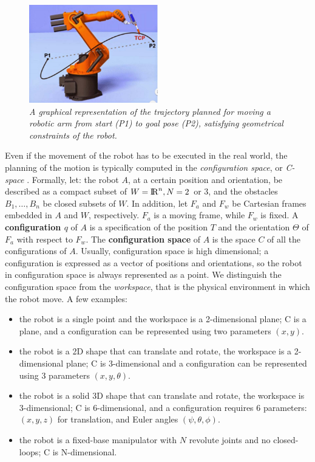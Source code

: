 \begin{figure}
	\centering
	\includegraphics[width=0.5\textwidth]{Images/background_and_tools/motionPlanningArm.png}
	\caption{\textit{A graphical representation of the trajectory planned for moving a robotic arm from start (P1) to goal pose (P2), satisfying geometrical constraints of the robot.}}
	\label{fig:motionPlanningArm}
\end{figure}

Even if the movement of the robot has to be executed in the real world, the planning of the motion is typically computed in the \textit{configuration space}, or \textit{C-space} \parencite{configurationSpace}. Formally, let: the robot $A$, at a certain position and orientation, be described as a compact subset of $W = {\rm I\!R}^n, N=2$ or $3$, and the obstacles $B_1,\dots,B_n$ be closed subsets of $W$. In addition, let $F_a$ and $F_w$ be Cartesian frames embedded in $A$ and $W$, respectively. $F_a$ is a moving frame, while $F_w$ is fixed.  
A \textbf{configuration $q$} of  $A$ is a specification of the position $T$ and the orientation $\Theta$ of $F_a$ with respect to $F_w$. The \textbf{configuration space} of $A$ is the space $C$ of all the configurations of $A$.
Usually, configuration space is high dimensional; a configuration is expressed as a vector of positions and orientations, so the robot in configuration space is always represented as a point. We distinguish the configuration space from the \textit{workspace}, that is the physical environment in which the robot move. A few examples:
\begin{itemize}
	\item the robot is a single point and the workspace is a 2-dimensional plane; C is a plane, and a configuration can be represented using two parameters $(x, y)$.
	\item the robot is a 2D shape that can translate and rotate, the workspace is a 2-dimensional plane; C is 3-dimensional and a configuration can be represented using 3 parameters $(x, y, \theta)$.
	\item the robot is a solid 3D shape that can translate and rotate, the workspace is 3-dimensional; C is 6-dimensional, and a configuration requires 6 parameters: $(x, y, z)$ for translation, and Euler angles $(\psi, \theta, \phi)$.
	\item the robot is a fixed-base manipulator with $N$ revolute joints and no closed-loops; C is N-dimensional.
\end{itemize}

